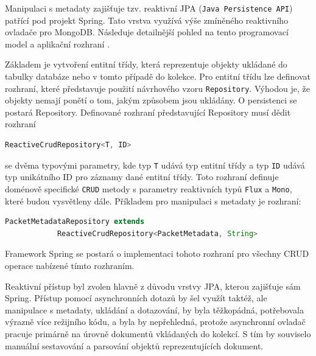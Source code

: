 
Manipulaci s metadaty zajišťuje tzv. reaktivní JPA (\texttt{Java Persistence API}) patřící pod projekt Spring. Tato vrstva využívá výše zmíněného reaktivního ovladače pro MongoDB. Následuje detailnější pohled na tento programovací model a aplikační rozhraní \cite{springDataReactive}.

Základem je vytvoření entitní třídy, která reprezentuje objekty ukládané do tabulky databáze nebo v tomto případě do kolekce. Pro entitní třídu lze definovat rozhraní, které představuje použití návrhového vzoru \texttt{Repository}. Výhodou je, že objekty nemají ponětí o tom, jakým způsobem jsou ukládány. O persistenci se postará Repository. Definované rozhraní představující Repository musí dědit rozhraní

\begin{lstlisting}[language=Java]
    ReactiveCrudRepository<T, ID>
\end{lstlisting}

\noindent se dvěma typovými parametry, kde typ \texttt{T} udává typ entitní třídy a typ \texttt{ID} udává typ unikátního ID pro záznamy dané entitní třídy. Toto rozhraní definuje doménově specifické \texttt{CRUD} metody s parametry reaktivních typů \texttt{Flux} a \texttt{Mono}, které budou vysvětleny dále. Příkladem pro manipulaci s metadaty je rozhraní:

\begin{lstlisting}[language=Java]
    PacketMetadataRepository extends
            ReactiveCrudRepository<PacketMetadata, String>
\end{lstlisting}

\noindent Framework Spring se postará o implementaci tohoto rozhraní pro všechny CRUD operace nabízené tímto rozhraním.

Reaktivní přístup byl zvolen hlavně z důvodu vrstvy JPA, kterou zajišťuje sám Spring. Přístup pomocí asynchronních dotazů by šel využít taktéž, ale manipulace s metadaty, ukládání a dotazování, by byla těžkopádná, potřebovala výrazně více režijního kódu, a byla by nepřehledná, protože asynchronní ovladač pracuje primárně na úrovně dokumentů vkládaných do kolekcí. S tím by souviselo manuální sestavování a parsování objektů reprezentujících dokument.


